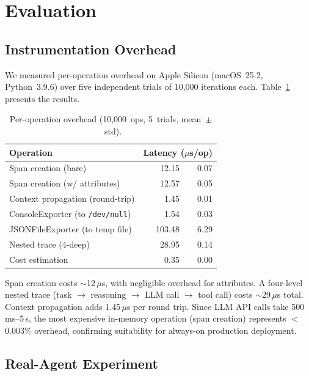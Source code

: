 \documentclass[sigplan,10pt,screen]{acmart}
\begin{document}
\section{Evaluation}
\label{sec:evaluation}

\subsection{Instrumentation Overhead}
\label{sec:overhead}

We measured per-operation overhead on Apple Silicon (macOS~25.2,
Python~3.9.6) over five independent trials of 10{,}000 iterations
each.  Table~\ref{tab:overhead} presents the results.

\begin{table}[t]
\centering
\small
\caption{Per-operation overhead (10{,}000~ops, 5~trials, mean~$\pm$~std).}
\label{tab:overhead}
\begin{tabular}{@{}lr@{~$\pm$~}r@{}}
\toprule
\textbf{Operation} & \multicolumn{2}{c}{\textbf{Latency ($\mu$s/op)}} \\
\midrule
Span creation (bare)           & 12.15 & 0.07 \\
Span creation (w/ attributes)  & 12.57 & 0.05 \\
Context propagation (round-trip) & 1.45 & 0.01 \\
ConsoleExporter (to \texttt{/dev/null})  & 1.54 & 0.03 \\
JSONFileExporter (to temp file) & 103.48 & 6.29 \\
Nested trace (4-deep)          & 28.95 & 0.14 \\
Cost estimation                &  0.35 & 0.00 \\
\bottomrule
\end{tabular}
\end{table}

Span creation costs $\sim$12\,$\mu$s, with negligible overhead for
attributes.  A four-level nested trace (task $\to$ reasoning $\to$
LLM call $\to$ tool call) costs $\sim$29\,$\mu$s total.  Context
propagation adds 1.45\,$\mu$s per round trip.  Since LLM API calls
take 500\,ms--5\,s, the most expensive in-memory operation (span
creation) represents $<$0.003\% overhead, confirming suitability for
always-on production deployment.

\subsection{Real-Agent Experiment}
\label{sec:real_agent}
\end{document}
